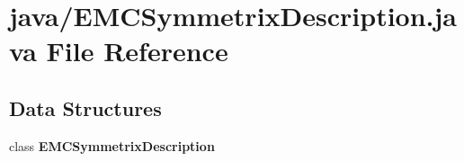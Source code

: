 \section{java/\-E\-M\-C\-Symmetrix\-Description.java File Reference}
\label{EMCSymmetrixDescription_8java}
\subsection*{Data Structures}
\begin{DoxyCompactItemize}
\item 
class {\bf E\-M\-C\-Symmetrix\-Description}
\end{DoxyCompactItemize}
